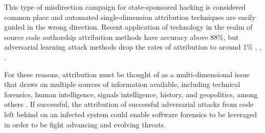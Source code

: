 \documentclass[12pt]{report}
\begin{document}
This type of misdirection campaign for state-sponsored hacking is considered common place and automated single-dimension attribution techniques are easily guided in the wrong direction.  Recent application of technology in the realm of source code authorship attribution methods have accuracy above 88\%, but adversarial learning attack methods drop the rates of attribution to around 1\% \cite{abuhamad2018large}, \cite{caliskan2015anonymizing}, \cite{quiring2019misleading}. 

For these reasons, attribution must be thought of as a multi-dimensional issue that draws on multiple sources of information available, including technical forensics, human intelligence, signals intelligence, history, and geopolitics, among others \cite{lin2016attribution}.  If successful, the attribution of successful adversarial attacks from code left behind on an infected system could enable software forensics to be leveraged in order to be fight advancing and evolving threats. 
\end{document}
